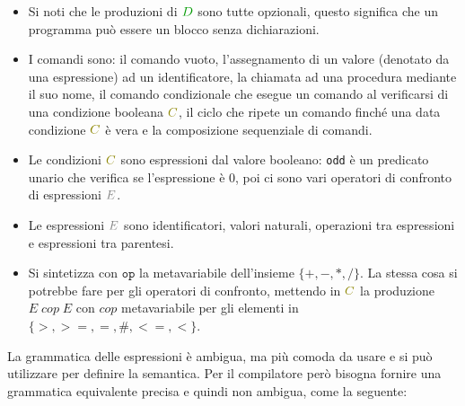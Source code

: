 \documentclass[a4paper]{article}
\begin{document}
\begin{itemize}
  \item Si noti che le produzioni di \( \color{green!60!black}D \) sono tutte opzionali, questo
    significa che un programma può essere un blocco senza dichiarazioni.

  \item I comandi sono: il comando vuoto, l’assegnamento di un valore (denotato da una
    espressione) ad un identificatore, la chiamata ad una procedura mediante il suo
    nome, il comando condizionale che esegue un comando al verificarsi di una
    condizione booleana \( \color{olive}C \), il ciclo che ripete un comando finché una data
    condizione \( \color{olive}C \) è vera e la composizione sequenziale di comandi.

  \item Le condizioni \( \color{olive}C \) sono espressioni dal valore booleano:
    \texttt{odd} è un predicato unario che verifica se l’espressione è
    0, poi ci sono vari operatori di confronto di espressioni \( \color{gray}E \).

  \item Le espressioni \( \color{gray}E \) sono identificatori, valori naturali,
    operazioni tra espressioni e espressioni tra parentesi.

  \item Si sintetizza con \( \texttt{op} \) la metavariabile dell’insieme
    \( \{+, -, *, /\} \). La stessa cosa si potrebbe fare per gli operatori
    di confronto, mettendo in \( \color{olive}C \) la produzione \( E \; cop \; E \) con
    \( cop \) metavariabile per gli elementi in \( \{ >, >=, =, \#, <=, < \} \).
\end{itemize}
La grammatica delle espressioni è ambigua, ma più comoda da usare e si può utilizzare
per definire la semantica. Per il compilatore però bisogna fornire una grammatica
equivalente precisa e quindi non ambigua, come la seguente:
\end{document}
